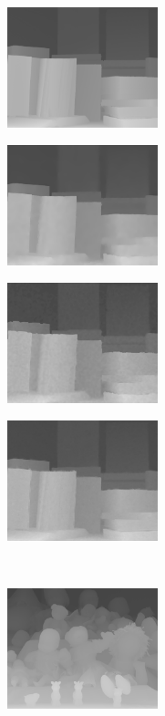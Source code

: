 \documentclass[preprint,10pt,5p,times,twocolumn]{elsarticle}
\begin{document}
\begin{figure}
\centering
\begin{subfigure}[b]{0.24\textwidth}
\includegraphics[height= 3.5cm, width=\textwidth]{fig_books.png}
\end{subfigure}
\begin{subfigure}[b]{0.24\textwidth}
\includegraphics[height= 3.5cm, width=\textwidth]{fig_books_8X_noise_lqdai.png}
\end{subfigure}
\begin{subfigure}[b]{0.24\textwidth}
\includegraphics[height= 3.5cm, width=\textwidth]{fig_books_8X_noise_cvpr.png}
\end{subfigure}
\begin{subfigure}[b]{0.24\textwidth}
\includegraphics[height= 3.5cm, width=\textwidth]{fig_books_8X_noise_iccv.png}
\end{subfigure}
\\ \vspace{0.1cm}
\begin{subfigure}[b]{0.24\textwidth}
\includegraphics[height= 3.5cm, width=\textwidth]{fig_dolls.png}

\end{subfigure}
\end{figure}
\end{document}
